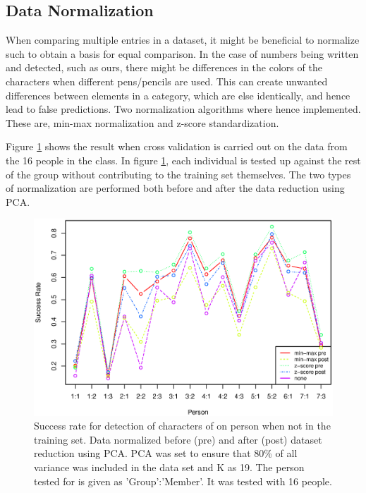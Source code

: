 \subsection{Data Normalization}
\label{sec:DataNormalization}
When comparing multiple entries in a dataset, it might be beneficial to normalize such to obtain a basis for equal comparison.
In the case of numbers being written and detected, such as ours, there might be differences in the colors of the characters when different pens/pencils are used.
This can create unwanted differences between elements in a category, which are else identically, and hence lead to false predictions.
Two normalization algorithms where hence implemented.
These are, min-max normalization and z-score standardization.

Figure \ref{fig:normalization_test_pre-post} shows the result when cross validation is carried out on the data from the 16 people in the class.
In figure \ref{fig:normalization_test_pre-post}, each individual is tested up against the rest of the group without contributing to the training set themselves. 
The two types of normalization are performed both before and after the data reduction using PCA.


\begin{figure}[H]
\centering
\includegraphics[width = 0.95 \textwidth]{graphics/graph_normalization_allppl}
\caption[Comparison of different students]{Success rate for detection of characters of on person when not in the training set. 
Data normalized before (pre) and after (post) dataset reduction using PCA.
PCA was set to ensure that 80\% of all variance was included in the data set and K as 19.
The person tested for is given as 'Group':'Member'.
It was tested with 16 people.}
\label{fig:normalization_test_pre-post}
\end{figure}

